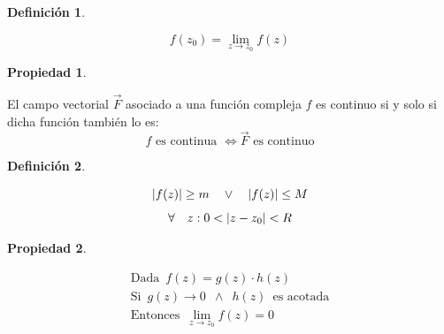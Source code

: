 \documentclass[a5paper,12pt,twoside]{book}
\newtheorem{defn}{{Definición}}[chapter]
\newtheorem{prop}{{Propiedad}}[chapter]
\begin{document}
\begin{mdframed}[style=MyFrame1]
    \begin{defn}
    \end{defn}
    \begin{equation*}
        f(z_0)=\lim_{z \to z_0}f(z)
    \end{equation*}
\end{mdframed}

\begin{mdframed}[style=MyFrame1]
    \begin{prop}
    \end{prop}
    El campo vectorial $\Vec{F}$ asociado a una función compleja $f$ es continuo si y solo si dicha función también lo es:
    \begin{equation*}
        \textrm{$f$ es continua $\iff \Vec{F}$ es continuo}
    \end{equation*}
\end{mdframed}

\begin{mdframed}[style=MyFrame1]
    \begin{defn}
    \end{defn}
    \begin{gather*}
        {\left| {f(z)} \right|} \geq m \quad \lor \quad {\left| {f(z)} \right|} \leq M
        \\[1ex]
        \forall \quad z: 0 < {\left| {z-z_0} \right|} < R
    \end{gather*}
\end{mdframed}

\begin{mdframed}[style=MyFrame1]
    \begin{prop}
    \end{prop}
    \begin{gather*}
        \textrm{Dada} \enspace f(z)=g(z) \cdot h(z)
        \\
        \textrm{Si} \enspace g(z) \to 0 \enspace \land \enspace h(z) \enspace \textrm{es acotada}
        \\
        \textrm{Entonces} \enspace \lim_{z \to z_0} f(z) = 0
    \end{gather*}
\end{mdframed}
\end{document}
